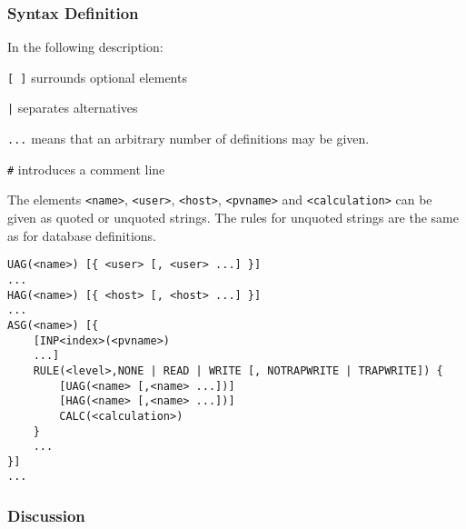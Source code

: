 \subsubsection{Syntax Definition}

In the following description:

\begin{description}
\item \verb|[ ]| surrounds optional elements
\item \verb+|+ separates alternatives
\item \verb|...| means that an arbitrary number of definitions may be given.
\item \verb|#| introduces a comment line
\end{description}

The elements \verb|<name>|, \verb|<user>|, \verb|<host>|, \verb|<pvname>| and \verb|<calculation>| can be given as quoted or unquoted strings. The 
rules for unquoted strings are the same as for database definitions.

\begin{verbatim}
UAG(<name>) [{ <user> [, <user> ...] }]
...
HAG(<name>) [{ <host> [, <host> ...] }]
...
ASG(<name>) [{
    [INP<index>(<pvname>)
    ...]
    RULE(<level>,NONE | READ | WRITE [, NOTRAPWRITE | TRAPWRITE]) {
        [UAG(<name> [,<name> ...])]
        [HAG(<name> [,<name> ...])]
        CALC(<calculation>)
    }
    ...
}]
...
\end{verbatim}

\subsubsection{Discussion}

